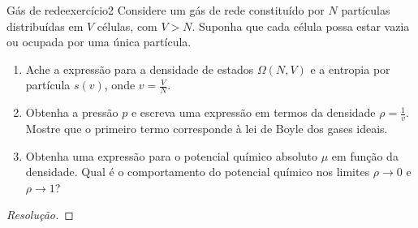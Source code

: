 \begin{exercício}{Gás de rede}{exercício2}
    Considere um gás de rede constituído por \(N\) partículas distribuídas em \(V\) células, com \(V > N\). Suponha que cada célula possa estar vazia ou ocupada por uma única partícula.
    \begin{enumerate}[label=(\alph*)]
        \item Ache a expressão para a densidade de estados \(\Omega(N, V)\) e a entropia por partícula \(s(v)\), onde \(v = \frac{V}{N}\).
        \item Obtenha a pressão \(p\) e escreva uma expressão em termos da densidade \(\rho = \frac1v\). Mostre que o primeiro termo corresponde à lei de Boyle dos gases ideais.
        \item Obtenha uma expressão para o potencial químico absoluto \(\mu\) em função da densidade. Qual é o comportamento do potencial químico nos limites \(\rho \to 0\) e \(\rho \to 1\)?
    \end{enumerate}
\end{exercício}
\begin{proof}[Resolução]

\end{proof}
